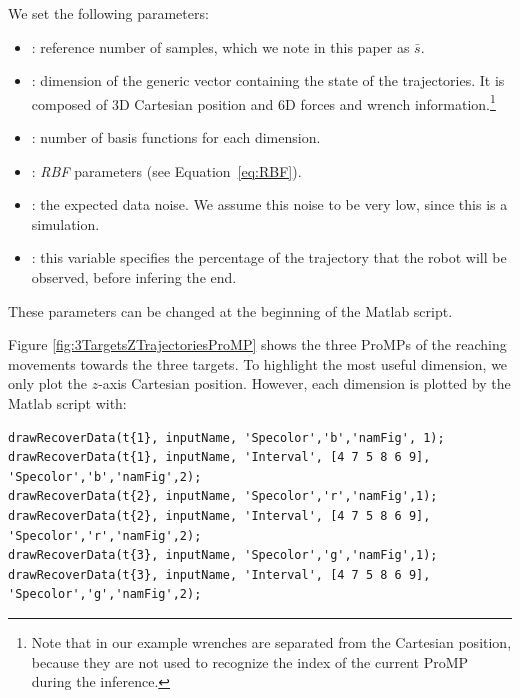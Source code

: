 \documentclass[utf8]{frontiersSCNS} %
\newcommand{\rev}[1]{\textcolor{blue}{#1}}
\begin{document}
We set the following parameters:
\begin{itemize}
\item {}: reference number of samples, which we note in this paper as $\bar{s}$.
\item {}: dimension of the generic vector containing the state of the trajectories. It is composed of 3D Cartesian position and 6D forces and wrench information.\footnote{Note that in our example wrenches are separated from the Cartesian position, because they are not used to recognize the index of the current ProMP during the inference.}
\item {}: number of basis functions for each  dimension.
\item {}: \textit{RBF} parameters (see Equation~\ref{eq:RBF}).
\item {}: the expected data noise. We assume this noise to be very low, since this is a simulation.
\item {}: this variable specifies the percentage of the trajectory that the robot will be observed, before infering the end.
\end{itemize}
These parameters can be changed at the beginning of the Matlab script.


Figure \ref{fig:3TargetsZTrajectoriesProMP} shows the three ProMPs of the reaching movements towards the three targets. To highlight the most useful dimension, we only plot the $z$-axis Cartesian position. However, each dimension is plotted by the Matlab script with:
\begin{lstlisting}
drawRecoverData(t{1}, inputName, 'Specolor','b','namFig', 1);
drawRecoverData(t{1}, inputName, 'Interval', [4 7 5 8 6 9], 'Specolor','b','namFig',2);
drawRecoverData(t{2}, inputName, 'Specolor','r','namFig',1);
drawRecoverData(t{2}, inputName, 'Interval', [4 7 5 8 6 9], 'Specolor','r','namFig',2);
drawRecoverData(t{3}, inputName, 'Specolor','g','namFig',1);
drawRecoverData(t{3}, inputName, 'Interval', [4 7 5 8 6 9], 'Specolor','g','namFig',2);
\end{lstlisting}
\end{document}
